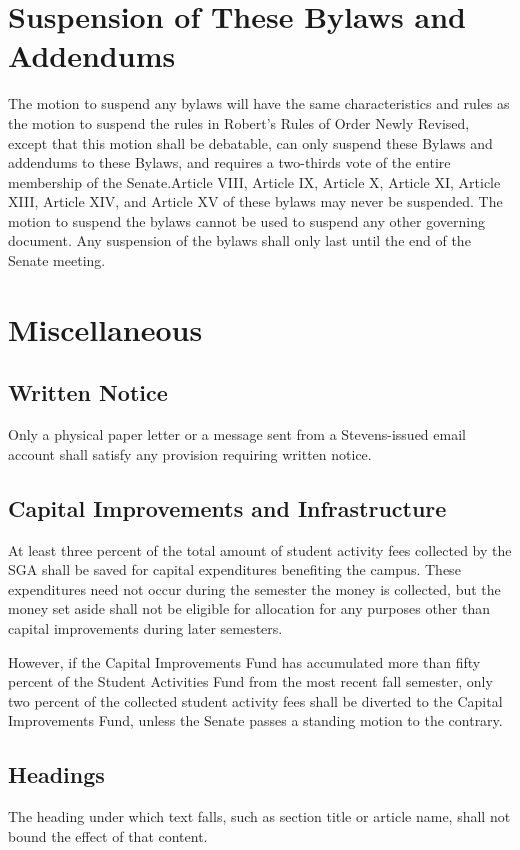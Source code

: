 \documentclass[12pt]{scrreprt}
\begin{document}
\chapter{Suspension of These Bylaws and Addendums} \label{sec:suspension}
The motion to suspend any bylaws will have the same characteristics and rules as the motion to
suspend the rules in Robert’s Rules of Order Newly Revised, except that this motion shall be
debatable, can only suspend these Bylaws and addendums to these Bylaws, and requires a two-thirds
vote of the entire membership of the Senate.Article VIII, Article IX, Article X, Article XI, Article XIII, Article XIV, and
Article XV of these bylaws may never be suspended. The motion to suspend the bylaws cannot be
used to suspend any other governing document. Any suspension of the bylaws shall only last until
the end of the Senate meeting. 

\chapter{Miscellaneous}

\section{Written Notice}
Only a physical paper letter or a message sent from a Stevens-issued email account shall satisfy any provision
requiring written notice.

\section{Capital Improvements and Infrastructure}
At least three percent of the total amount of student activity fees collected 
by the SGA shall be saved for capital expenditures benefiting the campus. 
These expenditures need not occur during the semester the money is collected, 
but the money set aside shall not be eligible for allocation for any purposes 
other than capital improvements during later semesters. 

However, if the Capital Improvements Fund has accumulated more than fifty 
percent of the Student Activities Fund from the most recent fall semester, 
only two percent of the collected student activity fees shall be diverted to 
the Capital Improvements Fund, unless the Senate passes a standing motion to 
the contrary. 

\section{Headings}
The heading under which text falls, such as section title or article name, 
shall not bound the effect of that content. 
\end{document}
